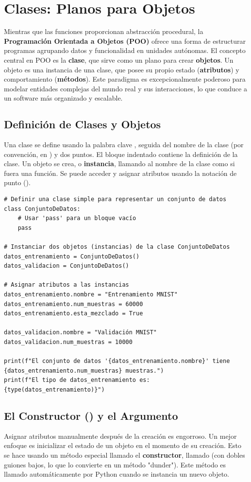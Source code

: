 \section{Clases: Planos para Objetos}
\label{sec:classes_objects}
Mientras que las funciones proporcionan abstracción procedural, la \textbf{Programación Orientada a Objetos (POO)} ofrece una forma de estructurar programas agrupando datos y funcionalidad en unidades autónomas. El concepto central en POO es la \textbf{clase}, que sirve como un plano para crear \textbf{objetos}. Un objeto es una instancia de una clase, que posee su propio estado (\textbf{atributos}) y comportamiento (\textbf{métodos}). Este paradigma es excepcionalmente poderoso para modelar entidades complejas del mundo real y sus interacciones, lo que conduce a un software más organizado y escalable.

\subsection{Definición de Clases y Objetos}
\label{subsec:class_definition}
Una clase se define usando la palabra clave , seguida del nombre de la clase (por convención, en ) y dos puntos. El bloque indentado contiene la definición de la clase. Un objeto se crea, o \textbf{instancia}, llamando al nombre de la clase como si fuera una función. Se puede acceder y asignar atributos usando la notación de punto ().

\text{ }\begin{verbatim}
# Definir una clase simple para representar un conjunto de datos
class ConjuntoDeDatos:
    # Usar 'pass' para un bloque vacío
    pass

# Instanciar dos objetos (instancias) de la clase ConjuntoDeDatos
datos_entrenamiento = ConjuntoDeDatos()
datos_validacion = ConjuntoDeDatos()

# Asignar atributos a las instancias
datos_entrenamiento.nombre = "Entrenamiento MNIST"
datos_entrenamiento.num_muestras = 60000
datos_entrenamiento.esta_mezclado = True

datos_validacion.nombre = "Validación MNIST"
datos_validacion.num_muestras = 10000

print(f"El conjunto de datos '{datos_entrenamiento.nombre}' tiene {datos_entrenamiento.num_muestras} muestras.")
print(f"El tipo de datos_entrenamiento es: {type(datos_entrenamiento)}")
\end{verbatim}

\subsection{El Constructor () y el Argumento }
\label{subsec:init_self}
Asignar atributos manualmente después de la creación es engorroso. Un mejor enfoque es inicializar el estado de un objeto en el momento de su creación. Esto se hace usando un método especial llamado el \textbf{constructor}, llamado  (con dobles guiones bajos, lo que lo convierte en un método "dunder"). Este método es llamado automáticamente por Python cuando se instancia un nuevo objeto.

